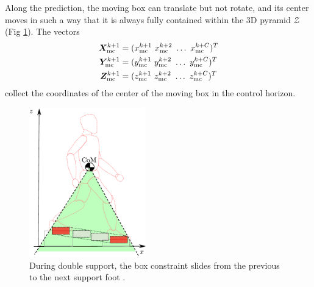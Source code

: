 Along the prediction, the moving box can translate but not rotate, and its
center moves in such a way that it is always
fully contained within the 3D pyramid $\mathcal{Z}$
(Fig \ref{fig:SYROCO18-double-support3D}).
The vectors
\begin{align*}
    \bm{X}_{\rm mc}^{k+1} &= (x_{\rm mc}^{k+1} \ x_{\rm mc}^{k+2} \ \dots \ x_{\rm mc}^{k+C})^T \\
    \bm{Y}_{\rm mc}^{k+1} &= (y_{\rm mc}^{k+1} \ y_{\rm mc}^{k+2} \ \dots \ y_{\rm mc}^{k+C})^T \\
    \bm{Z}_{\rm mc}^{k+1} &= (z_{\rm mc}^{k+1} \ z_{\rm mc}^{k+2} \ \dots \ z_{\rm mc}^{k+C})^T
\end{align*}
collect the coordinates of the center of the moving box in the control horizon.
\begin{figure}
    \centering
    \includegraphics[width=0.45\textwidth]{figures/SYROCO18-double-support3D.pdf}
    \caption{During double support, the box constraint slides from the
        previous to the next support foot \cite{Zamparelli2018SYROCO}.}
    \label{fig:SYROCO18-double-support3D}
\end{figure}


